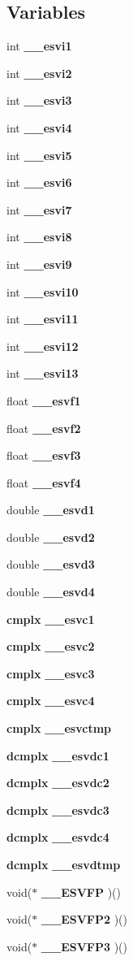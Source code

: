 \subsection*{Variables}
\begin{CompactItemize}
\item 
int {\bf \_\-\_\-esvi1}
\item 
int {\bf \_\-\_\-esvi2}
\item 
int {\bf \_\-\_\-esvi3}
\item 
int {\bf \_\-\_\-esvi4}
\item 
int {\bf \_\-\_\-esvi5}
\item 
int {\bf \_\-\_\-esvi6}
\item 
int {\bf \_\-\_\-esvi7}
\item 
int {\bf \_\-\_\-esvi8}
\item 
int {\bf \_\-\_\-esvi9}
\item 
int {\bf \_\-\_\-esvi10}
\item 
int {\bf \_\-\_\-esvi11}
\item 
int {\bf \_\-\_\-esvi12}
\item 
int {\bf \_\-\_\-esvi13}
\item 
float {\bf \_\-\_\-esvf1}
\item 
float {\bf \_\-\_\-esvf2}
\item 
float {\bf \_\-\_\-esvf3}
\item 
float {\bf \_\-\_\-esvf4}
\item 
double {\bf \_\-\_\-esvd1}
\item 
double {\bf \_\-\_\-esvd2}
\item 
double {\bf \_\-\_\-esvd3}
\item 
double {\bf \_\-\_\-esvd4}
\item 
{\bf cmplx} {\bf \_\-\_\-esvc1}
\item 
{\bf cmplx} {\bf \_\-\_\-esvc2}
\item 
{\bf cmplx} {\bf \_\-\_\-esvc3}
\item 
{\bf cmplx} {\bf \_\-\_\-esvc4}
\item 
{\bf cmplx} {\bf \_\-\_\-esvctmp}
\item 
{\bf dcmplx} {\bf \_\-\_\-esvdc1}
\item 
{\bf dcmplx} {\bf \_\-\_\-esvdc2}
\item 
{\bf dcmplx} {\bf \_\-\_\-esvdc3}
\item 
{\bf dcmplx} {\bf \_\-\_\-esvdc4}
\item 
{\bf dcmplx} {\bf \_\-\_\-esvdtmp}
\item 
void($\ast$ {\bf \_\-\_\-ESVFP} )()
\item 
void($\ast$ {\bf \_\-\_\-ESVFP2} )()
\item 
void($\ast$ {\bf \_\-\_\-ESVFP3} )()
\end{CompactItemize}


